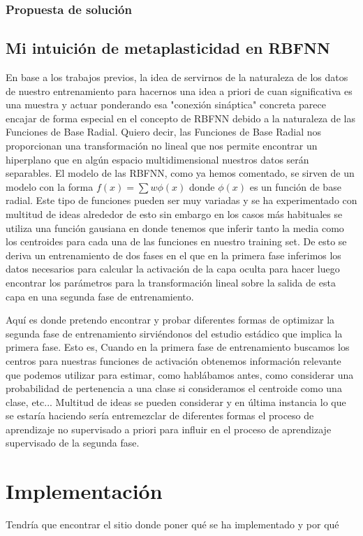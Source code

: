 \documentclass[10pt,a4paper, twocolumn]{report}
\begin{document}
\subsection{Propuesta de solución}
\section{Mi intuición de metaplasticidad en RBFNN}
En base a los trabajos previos, la idea de servirnos de la naturaleza de los datos de nuestro entrenamiento para hacernos una idea a priori de cuan significativa es una muestra y actuar ponderando esa "conexión sináptica" concreta parece encajar de forma especial en el concepto de RBFNN debido a la naturaleza de las Funciones de Base Radial. Quiero decir, las Funciones de Base Radial nos proporcionan una transformación no lineal que nos permite encontrar un hiperplano que en algún espacio multidimensional nuestros datos serán separables. El modelo de las RBFNN, como ya hemos comentado, se sirven de un modelo con la forma $f(x)=\sum w \phi(x)$ donde $\phi(x)$ es un función de base radial. Este tipo de funciones pueden ser muy variadas y se ha experimentado con multitud de ideas alrededor de esto sin embargo en los casos más habituales se utiliza una función gausiana en donde tenemos que inferir tanto la media como los centroides para cada una de las funciones en nuestro training set. De esto se deriva un entrenamiento de dos fases en el que en la primera fase inferimos los datos necesarios para calcular la activación de la capa oculta para hacer luego encontrar los parámetros para la transformación lineal sobre la salida de esta capa en una segunda fase de entrenamiento.

Aquí es donde pretendo encontrar y probar diferentes formas de optimizar la segunda fase de entrenamiento sirviéndonos del estudio estádico que implica la primera fase. Esto es, Cuando en la primera fase de entrenamiento buscamos los centros para nuestras funciones de activación obtenemos información relevante que podemos utilizar para estimar, como hablábamos antes, como considerar una probabilidad de pertenencia a una clase si consideramos el centroide como una clase, etc... Multitud de ideas se pueden considerar y en última instancia lo que se estaría haciendo sería entremezclar de diferentes formas el proceso de aprendizaje no supervisado a priori para influir en el proceso de aprendizaje supervisado de la segunda fase.


\chapter{Implementación}
Tendría que encontrar el sitio donde poner qué se ha implementado y por qué
\end{document}
